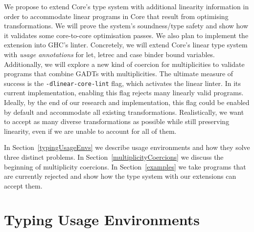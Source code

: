 \documentclass[]{lwnovathesis}
\begin{document}

We propose to extend Core's type system with additional linearity
information in order to accommodate linear programs in Core that
result from optimising transformations. We will prove the system's
soundness/type safety and show how it validates some core-to-core optimisation
passes. We also plan to implement the extension into GHC's
linter. Concretely, we will extend Core's linear type system with
\emph{usage annotations} for let, letrec and case binder bound
variables. Additionally, we will explore a new kind of coercion for
multiplicities to validate programs that combine GADTs with
multiplicities.
%
The ultimate measure of success is the \verb=-dlinear-core-lint= flag,
which activates the linear linter. In its current implementation,
enabling this flag rejects many linearly valid programs. Ideally, by
the end of our research and implementation, this flag could be enabled by
default and accommodate all existing transformations. Realistically, we want to
accept as many diverse transformations as possible while still preserving
linearity, even if we are unable to account for all of them.

In Section~\ref{typingUsageEnvs} we describe usage environments and how they
solve three distinct problems. In Section~\ref{multiplicityCoercions} we discuss
the beginning of multiplicity coercions. In Section~\ref{examples} we take
programs that are currently rejected and show how the type system with our
extensions can accept them.




\section{Typing Usage Environments\label{typingUsageEnvs}}
\end{document}
